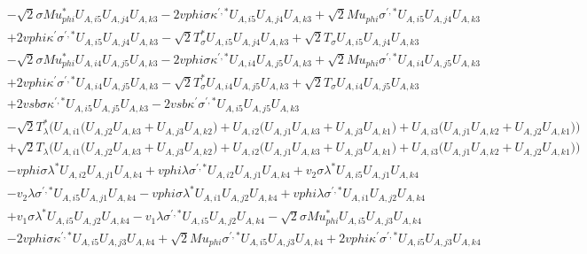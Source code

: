 \begin{align}
 &- \sqrt{2} \sigma Mu_{phi}^* U_{A,{i 5}} U_{A,{j 4}} U_{A,{k 3}} -2 vphi \sigma \kappa^{\prime,*} U_{A,{i 5}} U_{A,{j 4}} U_{A,{k 3}} +\sqrt{2} Mu_{phi} \sigma^{\prime,*} U_{A,{i 5}} U_{A,{j 4}} U_{A,{k 3}} \nonumber \\ 
 &+2 vphi \kappa^\prime \sigma^{\prime,*} U_{A,{i 5}} U_{A,{j 4}} U_{A,{k 3}} - \sqrt{2} T_{\sigma}^* U_{A,{i 5}} U_{A,{j 4}} U_{A,{k 3}} +\sqrt{2} T_{\sigma} U_{A,{i 5}} U_{A,{j 4}} U_{A,{k 3}} \nonumber \\ 
 &- \sqrt{2} \sigma Mu_{phi}^* U_{A,{i 4}} U_{A,{j 5}} U_{A,{k 3}} -2 vphi \sigma \kappa^{\prime,*} U_{A,{i 4}} U_{A,{j 5}} U_{A,{k 3}} +\sqrt{2} Mu_{phi} \sigma^{\prime,*} U_{A,{i 4}} U_{A,{j 5}} U_{A,{k 3}} \nonumber \\ 
 &+2 vphi \kappa^\prime \sigma^{\prime,*} U_{A,{i 4}} U_{A,{j 5}} U_{A,{k 3}} - \sqrt{2} T_{\sigma}^* U_{A,{i 4}} U_{A,{j 5}} U_{A,{k 3}} +\sqrt{2} T_{\sigma} U_{A,{i 4}} U_{A,{j 5}} U_{A,{k 3}} \nonumber \\ 
 &+2 vsb \sigma \kappa^{\prime,*} U_{A,{i 5}} U_{A,{j 5}} U_{A,{k 3}} -2 vsb \kappa^\prime \sigma^{\prime,*} U_{A,{i 5}} U_{A,{j 5}} U_{A,{k 3}} \nonumber \\ 
 &- \sqrt{2} T_{\lambda}^* \Big(U_{A,{i 1}} \Big(U_{A,{j 2}} U_{A,{k 3}}  + U_{A,{j 3}} U_{A,{k 2}} \Big) + U_{A,{i 2}} \Big(U_{A,{j 1}} U_{A,{k 3}}  + U_{A,{j 3}} U_{A,{k 1}} \Big) + U_{A,{i 3}} \Big(U_{A,{j 1}} U_{A,{k 2}}  + U_{A,{j 2}} U_{A,{k 1}} \Big)\Big)\nonumber \\ 
 &+\sqrt{2} T_{\lambda} \Big(U_{A,{i 1}} \Big(U_{A,{j 2}} U_{A,{k 3}}  + U_{A,{j 3}} U_{A,{k 2}} \Big) + U_{A,{i 2}} \Big(U_{A,{j 1}} U_{A,{k 3}}  + U_{A,{j 3}} U_{A,{k 1}} \Big) + U_{A,{i 3}} \Big(U_{A,{j 1}} U_{A,{k 2}}  + U_{A,{j 2}} U_{A,{k 1}} \Big)\Big)\nonumber \\ 
 &- vphi \sigma \lambda^* U_{A,{i 2}} U_{A,{j 1}} U_{A,{k 4}} +vphi \lambda \sigma^{\prime,*} U_{A,{i 2}} U_{A,{j 1}} U_{A,{k 4}} +v_2 \sigma \lambda^* U_{A,{i 5}} U_{A,{j 1}} U_{A,{k 4}} \nonumber \\ 
 &- v_2 \lambda \sigma^{\prime,*} U_{A,{i 5}} U_{A,{j 1}} U_{A,{k 4}} - vphi \sigma \lambda^* U_{A,{i 1}} U_{A,{j 2}} U_{A,{k 4}} +vphi \lambda \sigma^{\prime,*} U_{A,{i 1}} U_{A,{j 2}} U_{A,{k 4}} \nonumber \\ 
 &+v_1 \sigma \lambda^* U_{A,{i 5}} U_{A,{j 2}} U_{A,{k 4}} - v_1 \lambda \sigma^{\prime,*} U_{A,{i 5}} U_{A,{j 2}} U_{A,{k 4}} - \sqrt{2} \sigma Mu_{phi}^* U_{A,{i 5}} U_{A,{j 3}} U_{A,{k 4}} \nonumber \\ 
 &-2 vphi \sigma \kappa^{\prime,*} U_{A,{i 5}} U_{A,{j 3}} U_{A,{k 4}} +\sqrt{2} Mu_{phi} \sigma^{\prime,*} U_{A,{i 5}} U_{A,{j 3}} U_{A,{k 4}} +2 vphi \kappa^\prime \sigma^{\prime,*} U_{A,{i 5}} U_{A,{j 3}} U_{A,{k 4}} \nonumber \\ 

\end{align}
